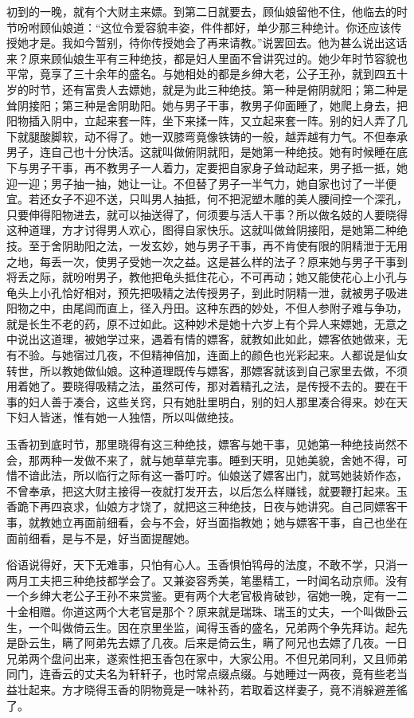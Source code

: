 \documentclass[a4paper,12pt,UTF8,twoside]{ctexbook}
\begin{document}
初到的一晚，就有个大财主来嫖。到第二日就要去，顾仙娘留他不住，他临去的时节吩咐顾仙娘道：“这位令爱容貌丰姿，件件都好，单少那三种绝计。你还应该传授她才是。我如今暂别，待你传授她会了再来请教。”说罢回去。他为甚么说出这话来？原来顾仙娘生平有三种绝技，都是妇人里面不曾讲究过的。她少年时节容貌也平常，竟享了三十余年的盛名。与她相处的都是乡绅大老，公子王孙，就到四五十岁的时节，还有富贵人去嫖她，就是为此三种绝技。第一种是俯阴就阳；第二种是耸阴接阳；第三种是舍阴助阳。她与男子干事，教男子仰面睡了，她爬上身去，把阳物插入阴中，立起来套一阵，坐下来揉一阵，又立起来套一阵。别的妇人弄了几下就腿酸脚软，动不得了。她一双膝弯竟像铁铸的一般，越弄越有力气。不但奉承男子，连自己也十分快活。这就叫做俯阴就阳，是她第一种绝技。她有时候睡在底下与男子干事，再不教男子一人着力，定要把自家身子耸动起来，男子抵一抵，她迎一迎；男子抽一抽，她让一让。不但替了男子一半气力，她自家也讨了一半便宜。若还女子不迎不送，只叫男人抽抵，何不把泥塑木雕的美人腰间控一个深孔，只要伸得阳物进去，就可以抽送得了，何须要与活人干事？所以做名妓的人要晓得这种道理，方才讨得男人欢心，图得自家快乐。这就叫做耸阴接阳，是她第二种绝技。至于舍阴助阳之法，一发玄妙，她与男子干事，再不肯使有限的阴精泄于无用之地，每丢一次，使男子受她一次之益。这是甚么样的法子？原来她与男子干事到将丢之际，就吩咐男子，教他把龟头抵住花心，不可再动；她又能使花心上小孔与龟头上小孔恰好相对，预先把吸精之法传授男子，到此时阴精一泄，就被男子吸进阳物之中，由尾闾而直上，径入丹田。这种东西的妙处，不但人参附子难与争功，就是长生不老的药，原不过如此。这种妙术是她十六岁上有个异人来嫖她，无意之中说出这道理，被她学过来，遇着有情的嫖客，就教如此如此，嫖客依她做来，无有不验。与她宿过几夜，不但精神倍加，连面上的颜色也光彩起来。人都说是仙女转世，所以教她做仙娘。这种道理既传与嫖客，那嫖客就该到自己家里去做，不须用着她了。要晓得吸精之法，虽然可传，那对着精孔之法，是传授不去的。要在干事的妇人善于凑合，这些关窍，只有她肚里明白，别的妇人那里凑合得来。妙在天下妇人皆迷，惟有她一人独悟，所以叫做绝技。

玉香初到底时节，那里晓得有这三种绝技，嫖客与她干事，见她第一种绝技尚然不会，那两种一发做不来了，就与她草草完事。睡到天明，见她美貌，舍她不得，可惜不谙此法，所以临行之际有这一番叮咛。仙娘送了嫖客出门，就骂她装娇作态，不曾奉承，把这大财主接得一夜就打发开去，以后怎么样赚钱，就要鞭打起来。玉香跪下再四哀求，仙娘方才饶了，就把这三种绝技，日夜与她讲究。自己同嫖客干事，就教她立再面前细看，会与不会，好当面指教她；她与嫖客干事，自己也坐在面前细看，是与不是，好当面提醒她。

俗语说得好，天下无难事，只怕有心人。玉香惧怕鸨母的法度，不敢不学，只消一两月工夫把三种绝技都学会了。又兼姿容秀美，笔墨精工，一时闻名动京师。没有一个乡绅大老公子王孙不来赏鉴。更有两个大老官极肯破钞，宿她一晚，定有一二十金相赠。你道这两个大老官是那个？原来就是瑞珠、瑞玉的丈夫，一个叫做卧云生，一个叫做倚云生。因在京里坐监，闻得玉香的盛名，兄弟两个争先拜访。起先是卧云生，瞒了阿弟先去嫖了几夜。后来是倚云生，瞒了阿兄也去嫖了几夜。一日兄弟两个盘问出来，遂索性把玉香包在家中，大家公用。不但兄弟同利，又且师弟同门，连香云的丈夫名为轩轩子，也时常点缀点缀。与她睡过一两夜，竟有些老当益壮起来。方才晓得玉香的阴物竟是一味补药，若取着这样妻子，竟不消躲避差徭了。
\end{document}
